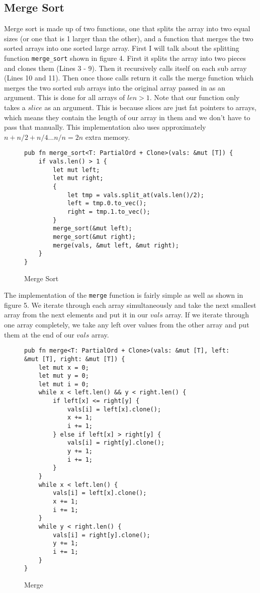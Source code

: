 \documentclass[12pt,letterpaper]{report}
\newcommand{\rust}[1]{\texttt{#1}}
\begin{document}
	\subsection*{Merge Sort}

	Merge sort\cite{merge_sort} is made up of two functions, one that splits the array into two equal sizes (or one that is 1 larger than the other), and a function that merges the two sorted arrays into one sorted large array. First I will talk about the splitting function \rust{merge_sort} shown in figure 4. First it splits the array into two pieces and clones them (Lines 3 - 9). Then it recursively calls itself on each sub array (Lines 10 and 11). Then once those calls return it calls the merge function which merges the two sorted sub arrays into the original array passed in as an argument. This is done for all arrays of $len > 1$. Note that our function only takes a $slice$ as an argument. This is because slices are just fat pointers to arrays, which means they contain the length of our array in them and we don't have to pass that manually. This implementation also uses approximately $n + n/2 + n/4 ... n/n = 2n$ extra memory.

	\begin{figure}[H]
    \begin{verbatim}
pub fn merge_sort<T: PartialOrd + Clone>(vals: &mut [T]) {
    if vals.len() > 1 {
        let mut left;
        let mut right;
        {
            let tmp = vals.split_at(vals.len()/2);
            left = tmp.0.to_vec();
            right = tmp.1.to_vec();
        }
        merge_sort(&mut left);
        merge_sort(&mut right);
        merge(vals, &mut left, &mut right);
    }
}
    \end{verbatim}
    \caption{Merge Sort}
\end{figure}

	The implementation of the \rust{merge} function is fairly simple as well as shown in figure 5. We iterate through each array simultaneously and take the next smallest array from the next elements and put it in our $vals$ array. If we iterate through one array completely, we take any left over values from the other array and put them at the end of our $vals$ array.

	\begin{figure}[H]
    \begin{verbatim}
pub fn merge<T: PartialOrd + Clone>(vals: &mut [T], left: &mut [T], right: &mut [T]) {
    let mut x = 0;
    let mut y = 0;
    let mut i = 0;
    while x < left.len() && y < right.len() {
        if left[x] <= right[y] {
            vals[i] = left[x].clone();
            x += 1;
            i += 1;
        } else if left[x] > right[y] {
            vals[i] = right[y].clone();
            y += 1;
            i += 1;
        }
    }
    while x < left.len() {
        vals[i] = left[x].clone();
        x += 1;
        i += 1;
    }
    while y < right.len() {
        vals[i] = right[y].clone();
        y += 1;
        i += 1;
    }
}
    \end{verbatim}
    \caption{Merge}
\end{figure}
\end{document}
